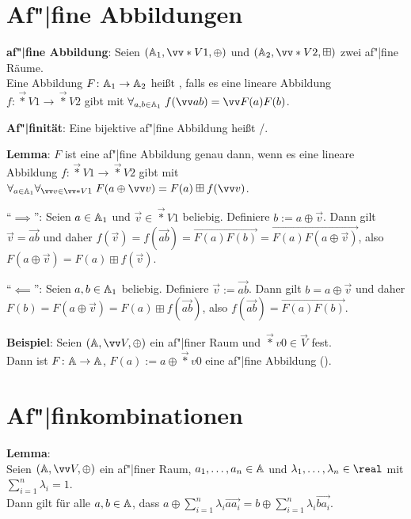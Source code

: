 \pagebreak

\section{%
    Af"|fine Abbildungen%
}

\textbf{af"|fine Abbildung}:
Seien $(\AA_1, \vec*{V}{1}, \oplus)$ und $(\AA_2, \vec*{V}{2}, \boxplus)$ zwei af"|fine Räume.\\
Eine Abbildung $F\colon \AA_1 \to \AA_2$ heißt , falls
es eine lineare Abbildung $f\colon \vec*{V}{1} \to \vec*{V}{2}$ gibt mit
$\forall_{a, b \in \AA_1}\; f(\vec{ab}) = \vec{F(a)F(b)}$.

\textbf{Af"|finität}:
Eine bijektive af"|fine Abbildung heißt /.

\linie

\textbf{Lemma}:
$F$ ist eine af"|fine Abbildung genau dann, wenn es eine
lineare Abbildung $f\colon \vec*{V}{1} \to \vec*{V}{2}$ gibt mit
$\forall_{a \in \AA_1} \forall_{\vec{v} \in \vec*{V}{1}}\;
F(a \oplus \vec{v}) = F(a) \boxplus f(\vec{v})$.

\begin{Beweis}
    "`$\implies$"':
    Seien $a \in \AA_1$ und $\vec{v} \in \vec*{V}{1}$ beliebig.
    Definiere $b := a \oplus \vec{v}$.
    Dann gilt $\vec{v} = \vec{ab}$ und daher
    $f(\vec{v}) = f(\vec{ab}) = \vec{F(a)F(b)} = \vec{F(a) F(a \oplus \vec{v})}$,
    also $F(a \oplus \vec{v}) = F(a) \boxplus f(\vec{v})$.

    "`$\impliedby$"':
    Seien $a, b \in \AA_1$ beliebig.
    Definiere $\vec{v} := \vec{ab}$.
    Dann gilt $b = a \oplus \vec{v}$ und daher\\
    $F(b) = F(a \oplus \vec{v}) = F(a) \boxplus f(\vec{ab})$,
    also $f(\vec{ab}) = \vec{F(a)F(b)}$.
\end{Beweis}

\linie

\textbf{Beispiel}:
Seien $(\AA, \vec{V}, \oplus)$ ein af"|finer Raum und $\vec*{v}{0} \in \vec{V}$ fest.\\
Dann ist $F\colon \AA \to \AA$, $F(a) := a \oplus \vec*{v}{0}$
eine af"|fine Abbildung ().

\section{%
    Af"|finkombinationen%
}

\textbf{Lemma}:\\
Seien $(\AA, \vec{V}, \oplus)$ ein af"|finer Raum,
$a_1, \dotsc, a_n \in \AA$ und $\lambda_1, \dotsc, \lambda_n \in \real$
mit $\sum_{i=1}^n \lambda_i = 1$.\\
Dann gilt für alle $a, b \in \AA$, dass
$a \oplus \sum_{i=1}^n \lambda_i \vec{aa_i} = b \oplus \sum_{i=1}^n \lambda_i \vec{ba_i}$.

